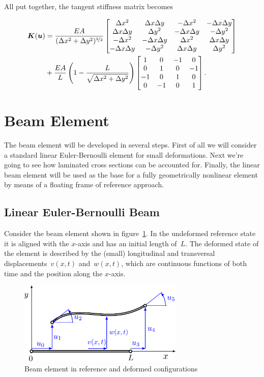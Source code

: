 All put together, the tangent stiffness matrix becomes

\begin{align*}
\boldsymbol{K}(\boldsymbol{u}) &= \frac{EA}{(\Delta x^2 + \Delta y^2)^{\nicefrac{3}{2}}}
\begin{bmatrix}
\Delta x^2 & \Delta x \Delta y & -\Delta x^2 & -\Delta x \Delta y\\
\Delta x \Delta y & \Delta y^2 & -\Delta x \Delta y & - \Delta y^2\\
-\Delta x^2 & -\Delta x \Delta y & \Delta x^2 & \Delta x \Delta y\\
-\Delta x \Delta y & -\Delta y^2 & \Delta x \Delta y & \Delta y^2
\end{bmatrix}\\
&+ \frac{EA}{L}\left(1 - \frac{L}{\sqrt{\Delta x^2 + \Delta y^2}}\right)
\begin{bmatrix}
1 & 0 & -1 & 0\\
0 & 1 & 0 & -1\\
-1 & 0 & 1 & 0\\
0 & -1 & 0 & 1
\end{bmatrix}.
\end{align*}

\newpage
\section{Beam Element}

The beam element will be developed in several steps.
First of all we will consider a standard linear Euler-Bernoulli element for small deformations.
Next we're going to see how laminated cross sections can be accounted for.
Finally, the linear beam element will be used as the base for a fully geometrically nonlinear element by means of a floating frame of reference approach.

\subsection{Linear Euler-Bernoulli Beam}

Consider the beam element shown in figure~\ref{fig:beam-linear}.
In the undeformed reference state it is aligned with the $x$-axis and has an initial length of~$L$. The deformed state of the element is described by the (small) longitudinal and transversal displacements~$v(x,t)$ and~$w(x,t)$, which are continuous functions of both time and the position along the $x$-axis.

\begin{figure}[h]
\centering
\includegraphics[width=0.7\textwidth]{figures/elements/beam-linear}
\caption{Beam element in reference and deformed configurations}
\label{fig:beam-linear}
\end{figure}

